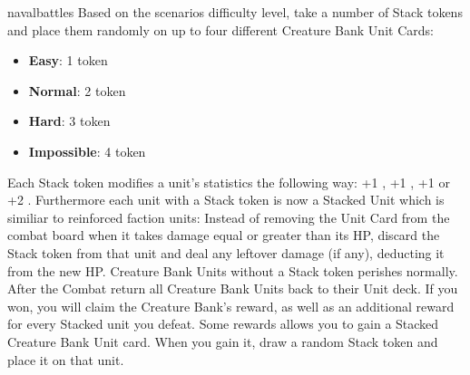 \begin{multicols*}{2}
\begin{expansion}{navalbattles}
  Based on the scenarios difficulty level, take a number of Stack tokens and place them randomly on up to four different Creature Bank Unit Cards:
  \begin{itemize}
    \item \textbf{Easy}: 1 token
    \item \textbf{Normal}: 2 token
    \item \textbf{Hard}: 3 token
    \item \textbf{Impossible}: 4 token
  \end{itemize}

  Each Stack token modifies a unit's statistics the following way: +1 , +1 , +1  or +2 . Furthermore each unit with a Stack token is now a Stacked Unit which is similiar to reinforced faction units: Instead of removing the Unit Card from the combat board when it takes damage equal or greater than its HP, discard the Stack token from that unit and deal any leftover damage (if any), deducting it from the new HP. Creature Bank Units without a Stack token perishes normally. After the Combat return all Creature Bank Units back to their Unit deck. If you won, you will claim the Creature Bank's reward, as well as an additional reward for every Stacked unit you defeat. Some rewards allows you to gain a Stacked Creature Bank Unit card. When you gain it, draw a random Stack token and place it on that unit.
\end{expansion}

\end{multicols*}
